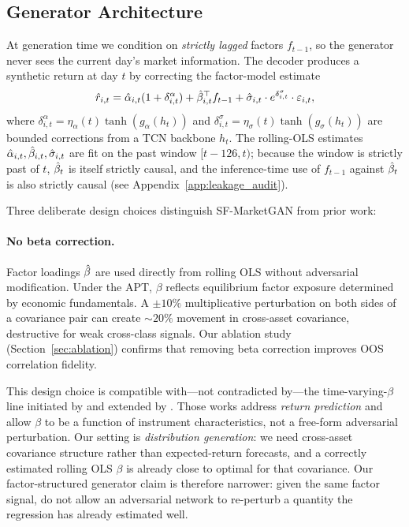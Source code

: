 \subsection{Generator Architecture}

At generation time we condition on \emph{strictly lagged} factors $f_{t-1}$, so the generator never sees the current day's market information. The decoder produces a synthetic return at day $t$ by correcting the factor-model estimate
\begin{equation}
    \hat{r}_{i,t} = \hat{\alpha}_{i,t}(1 + \delta^\alpha_{i,t}) + \hat{\beta}_{i,t}^\top f_{t-1} + \hat{\sigma}_{i,t} \cdot e^{\delta^\sigma_{i,t}} \cdot \varepsilon_{i,t},
    \label{eq:generator}
\end{equation}
where $\delta^\alpha_{i,t} = \eta_\alpha(t) \tanh(g_\alpha(h_t))$ and $\delta^\sigma_{i,t} = \eta_\sigma(t) \tanh(g_\sigma(h_t))$ are bounded corrections from a TCN backbone $h_t$. The rolling-OLS estimates $\hat{\alpha}_{i,t}, \hat{\beta}_{i,t}, \hat{\sigma}_{i,t}$ are fit on the past window $[t-126, t)$; because the window is strictly past of $t$, $\hat{\beta}_t$ is itself strictly causal, and the inference-time use of $f_{t-1}$ against $\hat{\beta}_t$ is also strictly causal (see Appendix~\ref{app:leakage_audit}).

Three deliberate design choices distinguish SF-MarketGAN from prior work:

\paragraph{No beta correction.}
Factor loadings $\hat{\beta}$ are used directly from rolling OLS without adversarial modification. Under the APT, $\beta$ reflects equilibrium factor exposure determined by economic fundamentals. A $\pm10\%$ multiplicative perturbation on both sides of a covariance pair can create $\sim\!20\%$ movement in cross-asset covariance, destructive for weak cross-class signals. Our ablation study (Section~\ref{sec:ablation}) confirms that removing beta correction improves OOS correlation fidelity.

This design choice is compatible with---not contradicted by---the time-varying-$\beta$ line initiated by \citet{kelly2019ipca} and extended by \citet{gu2021autoencoder}. Those works address \emph{return prediction} and allow $\beta$ to be a function of instrument characteristics, not a free-form adversarial perturbation. Our setting is \emph{distribution generation}: we need cross-asset covariance structure rather than expected-return forecasts, and a correctly estimated rolling OLS $\beta$ is already close to optimal for that covariance. Our factor-structured generator claim is therefore narrower: given the same factor signal, do not allow an adversarial network to re-perturb a quantity the regression has already estimated well.

